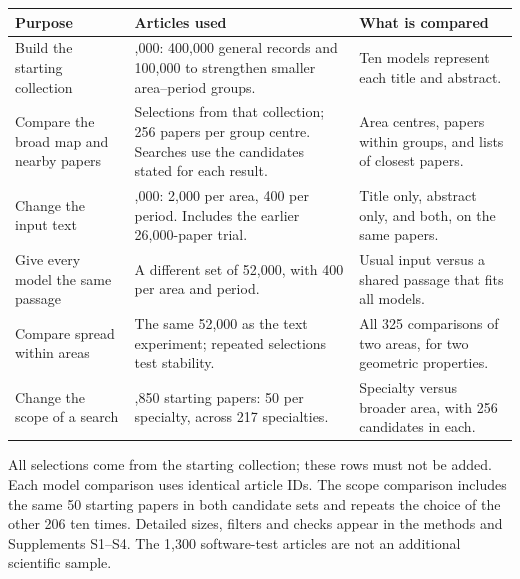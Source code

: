 \par\noindent\begin{minipage}{\linewidth}
\small
\setlength{\tabcolsep}{4pt}
\renewcommand{\arraystretch}{1.10}
\label{tab:T01}
\begin{tabular}{@{}>{\raggedright\arraybackslash}p{4.25cm}>{\raggedright\arraybackslash}p{6.1cm}>{\raggedright\arraybackslash}p{4.8cm}@{}}
\toprule
\textbf{Purpose} & \textbf{Articles used} & \textbf{What is compared} \\
\midrule
Build the starting collection & 500,000: 400,000 general records and 100,000 to strengthen smaller area--period groups. & Ten models represent each title and abstract. \\
\addlinespace[8pt]
Compare the broad map and nearby papers & Selections from that collection; 256 papers per group centre. Searches use the candidates stated for each result. & Area centres, papers within groups, and lists of closest papers. \\
\addlinespace[8pt]
Change the input text & 52,000: 2,000 per area, 400 per period. Includes the earlier 26,000-paper trial. & Title only, abstract only, and both, on the same papers. \\
\addlinespace[8pt]
Give every model the same passage & A different set of 52,000, with 400 per area and period. & Usual input versus a shared passage that fits all models. \\
\addlinespace[8pt]
Compare spread within areas & The same 52,000 as the text experiment; repeated selections test stability. & All 325 comparisons of two areas, for two geometric properties. \\
\addlinespace[8pt]
Change the scope of a search & 10,850 starting papers: 50 per specialty, across 217 specialties. & Specialty versus broader area, with 256 candidates in each. \\
\bottomrule
\end{tabular}
\par\smallskip
All selections come from the starting collection; these rows must not be added. Each model comparison uses identical article IDs. The scope comparison includes the same 50 starting papers in both candidate sets and repeats the choice of the other 206 ten times. Detailed sizes, filters and checks appear in the methods and Supplements S1--S4. The 1,300 software-test articles are not an additional scientific sample.
\end{minipage}\par
